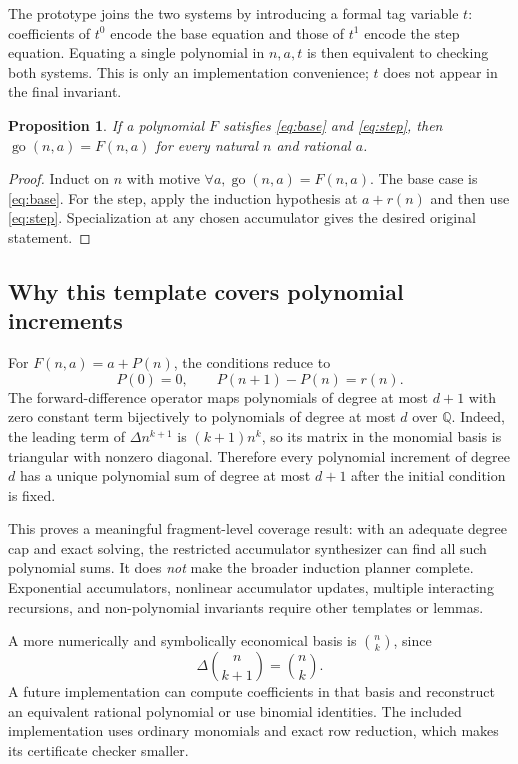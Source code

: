 \documentclass[11pt,a4paper]{article}
\newtheorem{proposition}{Proposition}[section]
\newcommand{\Q}{\mathbb{Q}}
\begin{document}
The prototype joins the two systems by introducing a formal tag variable $t$: coefficients of $t^0$ encode the base equation and those of $t^1$ encode the step equation. Equating a single polynomial in $n,a,t$ is then equivalent to checking both systems. This is only an implementation convenience; $t$ does not appear in the final invariant.

\begin{proposition}
If a polynomial $F$ satisfies \eqref{eq:base} and \eqref{eq:step}, then $\operatorname{go}(n,a)=F(n,a)$ for every natural $n$ and rational $a$.
\end{proposition}
\begin{proof}
Induct on $n$ with motive $\forall a,\operatorname{go}(n,a)=F(n,a)$. The base case is \eqref{eq:base}. For the step, apply the induction hypothesis at $a+r(n)$ and then use \eqref{eq:step}. Specialization at any chosen accumulator gives the desired original statement.
\end{proof}

\subsection{Why this template covers polynomial increments}

For $F(n,a)=a+P(n)$, the conditions reduce to
\[
P(0)=0,\qquad P(n+1)-P(n)=r(n).
\]
The forward-difference operator maps polynomials of degree at most $d+1$ with zero constant term bijectively to polynomials of degree at most $d$ over $\Q$. Indeed, the leading term of $\Delta n^{k+1}$ is $(k+1)n^k$, so its matrix in the monomial basis is triangular with nonzero diagonal. Therefore every polynomial increment of degree $d$ has a unique polynomial sum of degree at most $d+1$ after the initial condition is fixed.

This proves a meaningful fragment-level coverage result: with an adequate degree cap and exact solving, the restricted accumulator synthesizer can find all such polynomial sums. It does \emph{not} make the broader induction planner complete. Exponential accumulators, nonlinear accumulator updates, multiple interacting recursions, and non-polynomial invariants require other templates or lemmas.

A more numerically and symbolically economical basis is $\binom{n}{k}$, since
\[
\Delta\binom{n}{k+1}=\binom{n}{k}.
\]
A future implementation can compute coefficients in that basis and reconstruct an equivalent rational polynomial or use binomial identities. The included implementation uses ordinary monomials and exact row reduction, which makes its certificate checker smaller.
\end{document}
